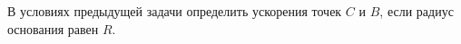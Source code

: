 В условиях предыдущей задачи определить ускорения точек $C$ и $B$,
если радиус основания равен $R$.
